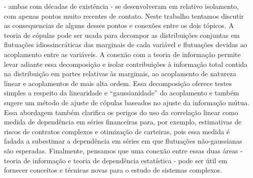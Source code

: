  - ambas com décadas de existência - se desenvolveram em relativo isolamento, com apenas pontos muito recentes de contato. Neste trabalho tentamos discutir as consequencias de alguns desses pontos e conexões entre os dois tópicos. A teoria de cópulas pode ser usada para decompor as distribuições conjuntas em flutuações idiossincráticas das marginais de cada variável e flutuações devidas ao acoplamento entre as variáveis. A conexão com a teoria de informação permite levar adiante essa decomposição e isolar contribuições à informação total contida na distribuição em partes relativas às marginais, ao acoplamento de natureza linear e acoplamentos de mais alta ordem. Essa decomposição oferece testes simples a respeito da linearidade e ``gaussianidade'' do acoplamento e também sugere um método de ajuste de cópulas baseados no ajuste da informação mútua. Essa abordagem também clarifica os perigos do uso da correlação linear como medida de dependência em séries financeiras para, por exemplo, estimativas de riscos de contratos complexos e otimização de carteiras, pois essa medida é fadada a subestimar a dependência em séries em que flutuações não-gaussianas são esperadas. Finalmente, pensamos que uma conexão entre essas duas áreas - teoria de informação e teoria de dependência estatística - pode ser útil em fornecer conceitos e técnicas novas para o estudo de sistemas complexos. 
